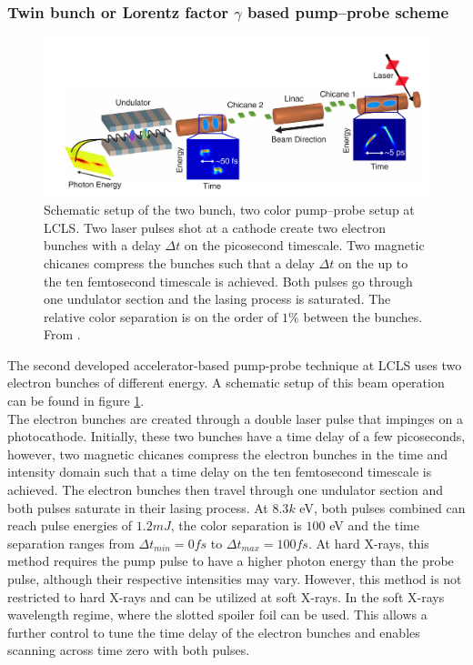 \subsubsection{Twin bunch or Lorentz factor $\gamma$ based pump--probe scheme}
\begin{figure}
	\centering
		\includegraphics[width=1.00\textwidth]{images/Agos-pump-probe-scheme.png}
	\caption[Schematic setup of a bunch based pump-probe setup.]{Schematic setup of the two bunch, two color pump--probe setup at LCLS. Two laser pulses shot at a cathode create two electron bunches with a delay $\Delta t$ on the picosecond timescale. Two magnetic chicanes compress the bunches such that a delay $\Delta t$ on the up to the ten femtosecond timescale is achieved. Both pulses go through one undulator section and the lasing process is saturated. The relative color separation is on the order of $1\%$ between the bunches. From \citep[\href{http://creativecommons.org/licenses/by/4.0/}{\ccby}]{Marinelli-2015-NatComm}.}
	\label{fig:Agos-pump-probe-scheme}
\end{figure}
The second developed accelerator-based pump-probe technique at LCLS \cite{Marinelli-2015-NatComm} uses two electron bunches of different energy. A schematic setup of this beam operation can be found in figure \ref{fig:Agos-pump-probe-scheme}.\\
The electron bunches are created through a double laser pulse that impinges on a photocathode. Initially, these two bunches have a time delay of a few picoseconds, however, two magnetic chicanes compress the electron bunches in the time and intensity domain such that a time delay on the ten femtosecond timescale is achieved. The electron bunches then travel through one undulator section and both pulses saturate in their lasing process. At $8.3k$ eV, both pulses combined can reach pulse energies of $1.2mJ$, the color separation is $100$ eV and the time separation ranges from $\Delta t_{min}=0fs$ to $\Delta t_{max}=100fs$. At hard X-rays, this method requires the pump pulse to have a higher photon energy than the probe pulse, although their respective intensities may vary. However, this method is not restricted to hard X-rays and can be utilized at soft X-rays. In the soft X-rays wavelength regime, where the slotted spoiler foil can be used. This allows a further control to tune the time delay of the electron bunches and enables scanning across time zero with both pulses.
